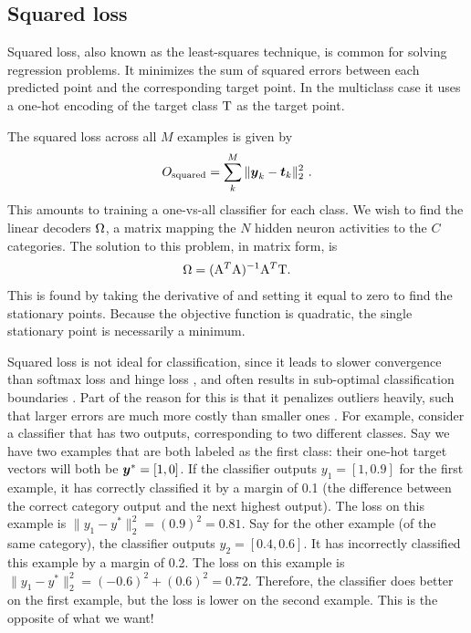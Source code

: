 \subsection{Squared loss}

Squared loss, also known as the least-squares technique,
is common for solving regression problems.
It minimizes the sum of squared errors between each predicted point
and the corresponding target point.
In the multiclass case it uses a one-hot encoding of the target class $\mathrm{T}$
as the target point.

The squared loss across all $M$ examples is given by
\begin{align}
  O_\text{squared} = \sum^M_k \|\vect y_k - \vect t_k\|_2^2 \text{ .}
  \eqnlabel{squaredloss}
\end{align}
This amounts to training a one-vs-all classifier for each class.
We wish to find the linear decoders $\Omega$,
a matrix mapping the $N$ hidden neuron activities to the $C$ categories.
The solution to this problem, in matrix form, is
\begin{align}
  \Dec = (\mat A^T \mat A)^{-1} \mat A^T \mat T.
  \eqnlabel{lstsq}
\end{align}
This is found by taking the derivative of 
and setting it equal to zero to find the stationary points.
Because the objective function is quadratic,
the single stationary point is necessarily a minimum.

Squared loss is not ideal for classification,
since it leads to slower convergence than softmax loss and hinge loss
\parencite{Rosasco2004},
and often results in sub-optimal classification boundaries \parencite[][p. 187]{Bishop2006}.
Part of the reason for this is that it penalizes outliers heavily,
such that larger errors are much more costly than smaller ones \parencite[\eg/][p. 186]{Bishop2006}.
For example, consider a classifier that has two outputs,
corresponding to two different classes.
Say we have two examples that are both labeled as the first class:
their one-hot target vectors will both be $\boldsymbol{y}^* = [1, 0]$.
If the classifier outputs $y_1 = [1, 0.9]$ for the first example,
it has correctly classified it
by a margin of 0.1 (the difference between the correct category output
and the next highest output).
The loss on this example is $\|y_1 - y^*\|_2^2 = (0.9)^2 = 0.81$.
Say for the other example (of the same category),
the classifier outputs $y_2 = [0.4, 0.6]$.
It has incorrectly classified this example by a margin of 0.2.
The loss on this example is $\|y_1 - y^*\|_2^2 = (-0.6)^2 + (0.6)^2 = 0.72$.
Therefore, the classifier does better on the first example,
but the loss is lower on the second example.
This is the opposite of what we want!

